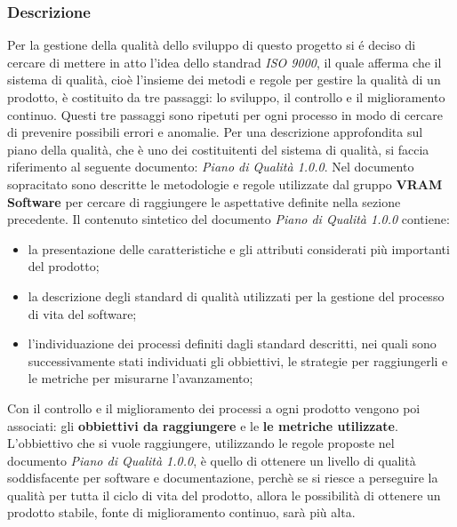 \subsubsection{Descrizione}
Per la gestione della qualità dello sviluppo di questo progetto si é deciso di cercare di mettere in atto l'idea dello standrad \textit{ISO 9000}, il quale afferma che il sistema di qualità, cioè l'insieme dei metodi e regole per gestire la qualità di un prodotto, è costituito da tre passaggi: lo sviluppo, il controllo e il miglioramento continuo. Questi tre passaggi sono ripetuti per ogni processo in modo di cercare di prevenire possibili errori e anomalie.
Per una descrizione approfondita sul piano della qualità, che è uno dei costituitenti del sistema di qualità, si faccia riferimento al seguente documento: \textit{Piano di Qualità 1.0.0}.
Nel documento sopracitato sono descritte le metodologie e regole utilizzate dal gruppo \textbf{VRAM Software} per cercare di raggiungere le aspettative definite nella sezione precedente.
Il contenuto sintetico del documento \textit{Piano di Qualità 1.0.0} contiene:
\begin{itemize}
	\item la presentazione delle caratteristiche e gli attributi considerati più importanti del prodotto;
	\item la descrizione degli standard di qualità utilizzati per la gestione del processo di vita del software;
	\item l'individuazione dei processi definiti dagli standard descritti, nei quali sono successivamente stati individuati gli obbiettivi, le strategie per raggiungerli e le metriche per misurarne l'avanzamento;
\end{itemize}
Con il controllo e il miglioramento dei processi a ogni prodotto vengono poi associati: gli \textbf{obbiettivi da raggiungere} e le \textbf{le metriche utilizzate}.
L'obbiettivo che si vuole raggiungere, utilizzando le regole proposte nel documento \textit{Piano di Qualità 1.0.0}, è quello di ottenere un livello di qualità soddisfacente per software e documentazione, perchè se si riesce a perseguire la qualità per tutta il ciclo di vita del prodotto, allora le possibilità di ottenere un prodotto stabile, fonte di miglioramento continuo, sarà più alta.

